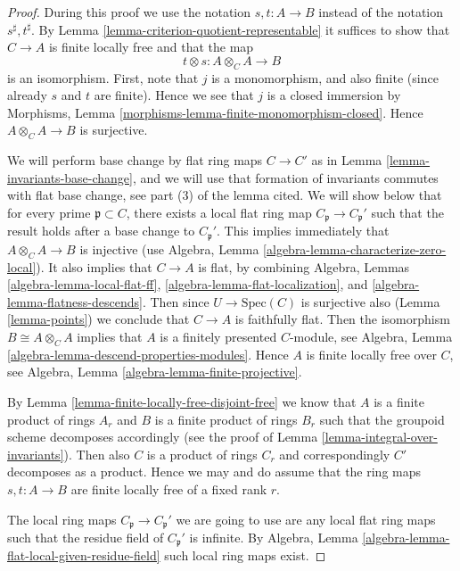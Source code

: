 \begin{proof}
During this proof we use the notation $s, t : A \to B$
instead of the notation $s^\sharp, t^\sharp$.
By Lemma \ref{lemma-criterion-quotient-representable}
it suffices to show that $C \to A$ is finite locally free
and that the map
$$
t \otimes s : A \otimes_C A \longrightarrow B
$$
is an isomorphism. First, note that $j$ is a monomorphism, and
also finite (since already $s$ and $t$ are finite). Hence we see
that $j$ is a closed immersion by
Morphisms, Lemma \ref{morphisms-lemma-finite-monomorphism-closed}.
Hence $A \otimes_C A \to B$ is surjective.

\medskip\noindent
We will perform base change by flat ring maps $C \to C'$ as in
Lemma \ref{lemma-invariants-base-change}, and we will use that
formation of invariants commutes with flat base change, see
part (3) of the lemma cited.
We will show below that for every prime $\mathfrak p \subset C$, there exists
a local flat ring map $C_{\mathfrak p} \to C_{\mathfrak p}'$
such that the result holds after a base change to $C_{\mathfrak p}'$.
This implies immediately
that $A \otimes_C A \to B$ is injective (use
Algebra, Lemma \ref{algebra-lemma-characterize-zero-local}).
It also implies that $C \to A$ is flat, by combining
Algebra, Lemmas \ref{algebra-lemma-local-flat-ff},
\ref{algebra-lemma-flat-localization}, and
\ref{algebra-lemma-flatness-descends}. Then since $U \to \text{Spec}(C)$
is surjective also (Lemma \ref{lemma-points}) we conclude that $C \to A$
is faithfully flat. Then the isomorphism $B \cong A \otimes_C A$
implies that $A$ is a finitely presented $C$-module, see
Algebra, Lemma \ref{algebra-lemma-descend-properties-modules}.
Hence $A$ is finite locally free over $C$, see
Algebra, Lemma \ref{algebra-lemma-finite-projective}.

\medskip\noindent
By Lemma \ref{lemma-finite-locally-free-disjoint-free}
we know that $A$ is a finite
product of rings $A_r$ and $B$ is a finite product of rings $B_r$
such that the groupoid scheme decomposes accordingly (see the proof
of Lemma \ref{lemma-integral-over-invariants}).
Then also $C$ is a product of rings $C_r$ and
correspondingly $C'$ decomposes as a product. Hence we may and do
assume that the ring maps $s, t : A \to B$ are finite
locally free of a fixed rank $r$.

\medskip\noindent
The local ring maps $C_{\mathfrak p} \to C_{\mathfrak p}'$ we are going
to use are any local flat ring maps such that the residue field of
$C_{\mathfrak p}'$ is infinite.
By Algebra, Lemma \ref{algebra-lemma-flat-local-given-residue-field}
such local ring maps exist.


\end{proof}
